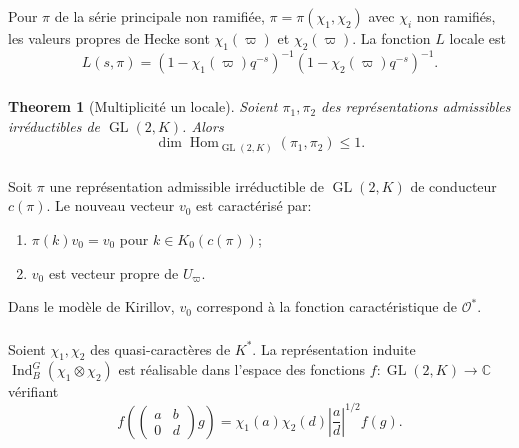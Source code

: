 \documentclass[11pt,a4paper]{amsart}
\theoremstyle{plain}
\newtheorem{theorem}{Theorem}[section]
\theoremstyle{definition}
\theoremstyle{remark}
\DeclareMathOperator{\Hom}{Hom}
\DeclareMathOperator{\GL}{GL}
\DeclareMathOperator{\Ind}{Ind}
\newcommand{\CC}{\mathbb{C}}
\newcommand{\cO}{\mathcal{O}}
\begin{document}
\subsubsection{}
\label{sec:3.2.6}

Pour $\pi$ de la s\'erie principale non ramifi\'ee, $\pi = \pi(\chi_1, \chi_2)$ avec $\chi_i$ non ramifi\'es, les valeurs propres de Hecke sont $\chi_1(\varpi)$ et $\chi_2(\varpi)$. La fonction $L$ locale est
\[ L(s,\pi) = (1 - \chi_1(\varpi) q^{-s})^{-1} (1 - \chi_2(\varpi) q^{-s})^{-1}. \]

\subsubsection{}
\label{sec:3.2.7}

\begin{theorem}[Multiplicit\'e un locale] \label{thm:mult1-local}
Soient $\pi_1, \pi_2$ des repr\'esentations admissibles irr\'eductibles de $\GL(2,K)$. Alors
\[ \dim \Hom_{\GL(2,K)}(\pi_1, \pi_2) \leq 1. \]
\end{theorem}

\subsubsection{}
\label{sec:3.2.8}

Soit $\pi$ une repr\'esentation admissible irr\'eductible de $\GL(2,K)$ de conducteur $c(\pi)$. Le nouveau vecteur $v_0$ est caract\'eris\'e par:
\begin{enumerate}
\item[(i)] $\pi(k) v_0 = v_0$ pour $k \in K_0(c(\pi))$;
\item[(ii)] $v_0$ est vecteur propre de $U_\varpi$.
\end{enumerate}
Dans le mod\`ele de Kirillov, $v_0$ correspond \`a la fonction caract\'eristique de $\cO^*$.

\subsubsection{}
\label{sec:3.2.9}

Soient $\chi_1, \chi_2$ des quasi-caract\`eres de $K^*$. La repr\'esentation induite $\Ind_B^G(\chi_1 \otimes \chi_2)$ est r\'ealisable dans l'espace des fonctions $f: \GL(2,K) \to \CC$ v\'erifiant
\[ f\left(\begin{pmatrix} a & b \\ 0 & d \end{pmatrix} g\right) = \chi_1(a)\chi_2(d)\left|\frac{a}{d}\right|^{1/2} f(g). \]
\end{document}
